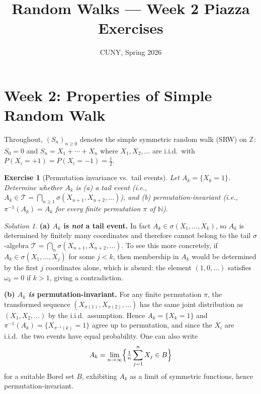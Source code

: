 \documentclass[12pt]{article}
\title{Random Walks --- Week 2 Piazza Exercises}
\author{CUNY, Spring 2026}
\date{}
\newtheorem{exercise}{Exercise}
\theoremstyle{remark}
\newtheorem*{solution}{Solution}
\begin{document}
\maketitle

\section*{Week 2: Properties of Simple Random Walk}

Throughout, $(S_n)_{n \ge 0}$ denotes the simple symmetric random walk (SRW) on $\mathbb{Z}$:
$S_0 = 0$ and $S_n = X_1 + \cdots + X_n$ where $X_1, X_2, \ldots$ are i.i.d.\ with
$P(X_i = +1) = P(X_i = -1) = \tfrac{1}{2}$.

\begin{exercise}[Permutation invariance vs.\ tail events]
Let $A_k = \{X_k = 1\}$. Determine whether $A_k$ is
(a) a tail event (i.e., $A_k \in \mathcal{T} = \bigcap_{n \ge 1} \sigma(X_{n+1}, X_{n+2}, \ldots)$), and
(b) permutation-invariant (i.e., $\pi^{-1}(A_k) = A_k$ for every finite permutation $\pi$ of $\mathbb{N}$).
\end{exercise}

\begin{solution}
\textbf{(a) $A_k$ is \emph{not} a tail event.} In fact $A_k \in \sigma(X_1, \ldots, X_k)$, so
$A_k$ is determined by finitely many coordinates and therefore cannot belong to the tail
$\sigma$-algebra $\mathcal{T} = \bigcap_{n} \sigma(X_{n+1}, X_{n+2}, \ldots)$.  To see this
more concretely, if $A_k \in \sigma(X_1,\ldots,X_j)$ for some $j < k$, then membership in
$A_k$ would be determined by the first $j$ coordinates alone, which is absurd: the element
$(1,0,\ldots)$ satisfies $\omega_k = 0$ if $k > 1$, giving a contradiction.

\textbf{(b) $A_k$ \emph{is} permutation-invariant.} For any finite permutation $\pi$, the
transformed sequence $(X_{\pi(1)}, X_{\pi(2)}, \ldots)$ has the same joint distribution as
$(X_1, X_2, \ldots)$ by the i.i.d.\ assumption. Hence $A_k = \{X_k = 1\}$ and
$\pi^{-1}(A_k) = \{X_{\pi^{-1}(k)} = 1\}$ agree up to permutation, and since the $X_i$
are i.i.d.\ the two events have equal probability. One can also write
\[
  A_k = \lim_{n \to \infty} \Bigl\{ \tfrac{1}{n}\sum_{j=1}^n X_j \in B \Bigr\}
\]
for a suitable Borel set $B$, exhibiting $A_k$ as a limit of symmetric functions, hence
permutation-invariant.
\end{solution}
\end{document}
